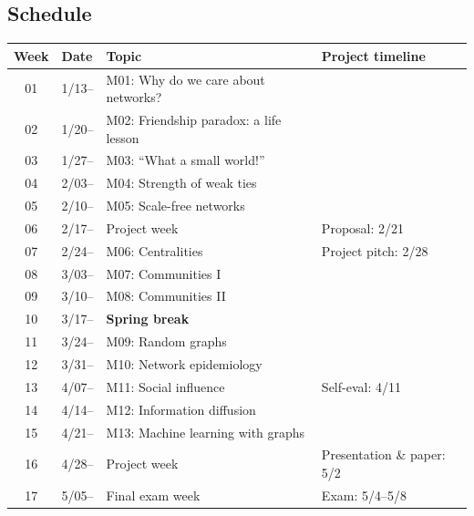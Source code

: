 \subsection{Schedule}\label{sub:schedule}%

\begin{tabular}{@{}clll@{}} \toprule
  Week & Date & Topic & Project timeline\\\midrule
  01 & 1/13-- & M01: Why do we care about networks? & \\
  02 & 1/20-- & M02: Friendship paradox: a life lesson & \\
  03 & 1/27-- & M03: ``What a small world!'' & \\
  04 & 2/03-- & M04: Strength of weak ties & \\
  05 & 2/10-- & M05: Scale-free networks & \\
  06 & 2/17-- & Project week & Proposal: 2/21 \\
  07 & 2/24-- & M06: Centralities & Project pitch: 2/28 \\
  08 & 3/03-- & M07: Communities I \\
  09 & 3/10-- & M08: Communities II \\
  10 & 3/17-- & \textbf{Spring break} \\
  11 & 3/24-- & M09: Random graphs \\
  12 & 3/31-- & M10: Network epidemiology \\
  13 & 4/07-- & M11: Social influence & Self-eval: 4/11 \\
  14 & 4/14-- & M12: Information diffusion \\
  15 & 4/21-- & M13: Machine learning with graphs  \\
  16 & 4/28-- & Project week & Presentation \& paper: 5/2 \\
  17 & 5/05-- & Final exam week & Exam: 5/4--5/8 \\ 
  \bottomrule
\end{tabular}


